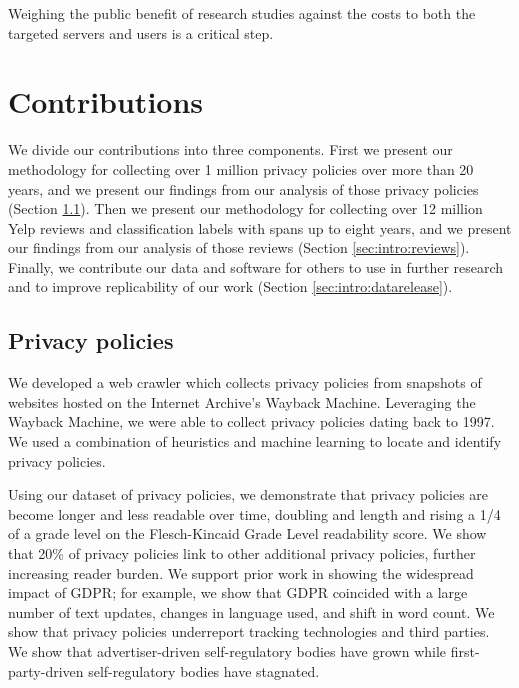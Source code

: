 Weighing the public benefit of research studies against the costs to both the targeted servers and users is a critical step.


\section{Contributions}

We divide our contributions into three components. First we present our methodology for collecting over 1 million privacy policies over more than 20 years, and we present our findings from our analysis of those privacy policies (Section \ref{sec:intro:privacypolicies}). Then we present our methodology for collecting over 12 million Yelp reviews and classification labels with spans up to eight years, and we present our findings from our analysis of those reviews (Section \ref{sec:intro:reviews}). Finally, we contribute our data and software for others to use in further research and to improve replicability of our work (Section \ref{sec:intro:datarelease}).



\subsection{Privacy policies} \label{sec:intro:privacypolicies}
We developed a web crawler which collects privacy policies from snapshots of websites hosted on the Internet Archive's Wayback Machine. Leveraging the Wayback Machine, we were able to collect privacy policies dating back to 1997. We used a combination of heuristics and machine learning to locate and identify privacy policies. 

Using our dataset of privacy policies, we demonstrate that privacy policies are become longer and less readable over time, doubling and length and rising a 1/4 of a grade level on the Flesch-Kincaid Grade Level readability score. We show that 20\% of privacy policies link to other additional privacy policies, further increasing reader burden. We support prior work in showing the widespread impact of GDPR; for example, we show that GDPR coincided with a large number of text updates, changes in language used, and shift in word count. We show that privacy policies underreport tracking technologies and third parties.  We show that advertiser-driven self-regulatory bodies have grown while first-party-driven self-regulatory bodies have stagnated. 



